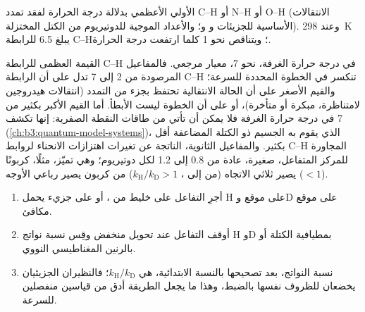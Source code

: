 \begin{omfigure}

{\small {} الأولي الأعظمي بدلالة درجة الحرارة لفقد
تمدد C--H أو N--H أو O--H (الانتقالات الأساسية للجزيئات  و و؛ 
والأعداد الموجية للدوتيريوم من الكتل المختزلة). وعند \qty{298}{K} يبلغ 6.5 للرابطة C--H؛
ويتناقص نحو 1 كلما ارتفعت درجة الحرارة.}
\end{omfigure}

القيمة العظمى للرابطة C--H في درجة حرارة الغرفة، نحو 7، معيار مرجعي. فالمفاعيل
المرصودة من 2 إلى 7 تدل على أن الرابطة C--H تنكسر في الخطوة المحددة
للسرعة؛ والقيم الأصغر على أن الحالة الانتقالية تحتفظ بجزء من التمدد
(انتقالات هيدروجين لامتناظرة، مبكرة أو متأخرة)، أو على أن الخطوة ليست
الأبطأ. أما القيم الأكبر بكثير من 7 في درجة حرارة الغرفة فلا يمكن أن تأتي من
طاقات النقطة الصفرية: إنها تكشف  (\cref{ch:b3:quantum-model-systems})،
الذي يقوم به الجسيم ذو الكتلة المضاعفة أقل بكثير. والمفاعيل الثانوية، الناتجة عن
تغيرات اهتزازات الانحناء لروابط C--H المجاورة للمركز المتفاعل،
صغيرة، عادة من 0.8 إلى 1.2 لكل دوتيريوم؛ وهي تميّز، مثلًا،
كربونًا يصير ثلاثي الاتجاه (من  إلى ، $k_{\mathrm H}/k_{\mathrm D} > 1$) من كربون يصير
رباعي الأوجه ($< 1$).

\begin{method}\label{met:b3:rate-theories:kie}
\begin{enumerate}
  \item أجرِ التفاعل على خليط من ، أو على جزيء
        يحمل H على موقع وD على موقع مكافئ.
  \item أوقف التفاعل عند تحويل منخفض وقِس نسبة نواتج H وD
        بمطيافية الكتلة أو بالرنين المغناطيسي النووي.
  \item نسبة النواتج، بعد تصحيحها بالنسبة الابتدائية، هي $k_{\mathrm H}/k_{\mathrm D}$؛ فالنظيران
        الجزيئيان يخضعان للظروف نفسها بالضبط، وهذا ما يجعل الطريقة
        أدق من قياسين منفصلين للسرعة.
\end{enumerate}
\end{method}

